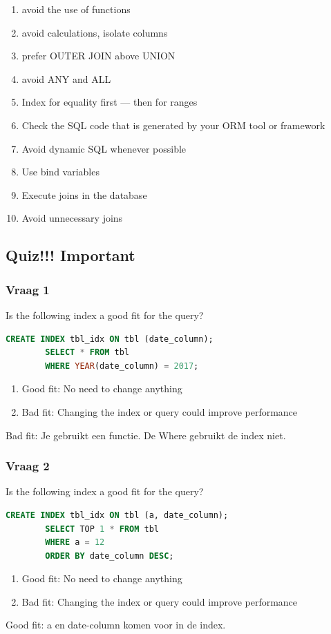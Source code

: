 \documentclass{report}
\begin{document}
    \begin{enumerate}
        \item avoid the use of functions
        \item avoid calculations, isolate columns
        \item prefer OUTER JOIN above UNION
        \item avoid ANY and ALL
        \item Index for equality first — then for ranges
        \item Check the SQL code that is generated by your ORM tool or framework
        \item Avoid dynamic SQL whenever possible
        \item Use bind variables
        \item Execute joins in the database
        \item Avoid unnecessary joins
    \end{enumerate}

    \subsection{Quiz!!! Important}
    \subsubsection{Vraag 1}
        Is the following index a good fit for the query?
        \begin{lstlisting}[language=SQL]
        CREATE INDEX tbl_idx ON tbl (date_column);
        SELECT * FROM tbl
        WHERE YEAR(date_column) = 2017;
        \end{lstlisting}
    \begin{enumerate}
        \item Good fit: No need to change anything
        \item Bad fit: Changing the index or query could improve performance
    \end{enumerate}
    Bad fit: Je gebruikt een functie. De Where gebruikt de index niet.
    
    \subsubsection{Vraag 2}
        Is the following index a good fit for the query?
        \begin{lstlisting}[language=SQL]
        CREATE INDEX tbl_idx ON tbl (a, date_column);
        SELECT TOP 1 * FROM tbl
        WHERE a = 12
        ORDER BY date_column DESC;
        \end{lstlisting}
        \begin{enumerate}
            \item Good fit: No need to change anything
            \item Bad fit: Changing the index or query could improve performance
        \end{enumerate}
        Good fit: a en date-column komen voor in de index.
        
\end{document}
